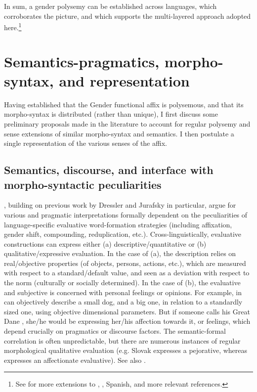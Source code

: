 In sum, a gender polysemy can be established across languages, which
corroborates the  picture, and which supports the multi-layered approach
adopted here.\footnote{See \citet{FassiFehri2016} for more extensions to
, , Spanish, and more relevant references.}

\section{Semantics-pragmatics, morpho-syntax, and representation}\label{sec:fassi:semprag}

Having established that the Gender functional affix is polysemous, and that its
morpho-syntax is distributed (rather than unique), I first discuss some
preliminary proposals made in the literature to account for regular polysemy
and sense extensions of similar morpho-syntax and semantics. I then postulate a
single representation of the various senses of the affix.

\subsection{Semantics, discourse, and interface with morpho-syntactic peculiarities}

\citet{Grandi2015}, building on previous work by Dressler and Jurafsky in
particular, argue for various  and pragmatic interpretations formally
dependent on the peculiarities of language-specific evaluative word-formation
strategies (including affixation, gender shift, compounding, reduplication,
etc.). Cross-linguistically, evaluative constructions can express either (a)
descriptive/quantitative or (b) qualitative/expressive evaluation. In the case
of (a), the description relies on real/objective properties (of objects,
persons, actions, etc.), which are measured with respect to a standard/default
value, and seen as a deviation with respect to the norm (culturally or socially
determined). In the case of (b), the evaluative and subjective is concerned
with personal feelings or opinions. For example,  in  can
objectively describe a small dog, and  a big one, in relation to a
standardly sized one, using objective dimensional parameters. But if someone
calls his Great Dane , she/he would be expressing her/his
affection towards it, or feelings, which depend crucially on pragmatics or
discourse factors. The semantic-formal correlation is often unpredictable, but
there are numerous instances of regular morphological qualitative evaluation
(e.g. Slovak  expresses a pejorative, whereas  expresses an affectionate evaluative). See also \citet{Cinque2014}.

